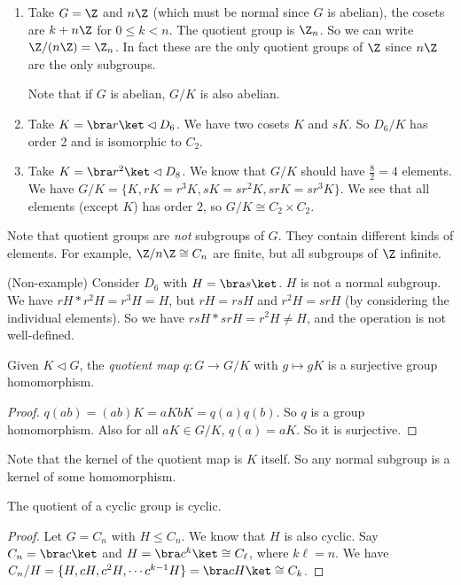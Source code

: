 \documentclass[a4paper]{article}
\begin{document}
\begin{eg}\leavevmode
  \begin{enumerate}
    \item Take $G = \Z$ and $n\Z$ (which must be normal since $G$ is abelian), the cosets are $k + n\Z$ for $0 \leq k < n$. The quotient group is $\Z_n$. So we can write $\Z/(n\Z) = \Z_n$. In fact these are the only quotient groups of $\Z$ since $n\Z$ are the only subgroups.

      Note that if $G$ is abelian, $G/K$ is also abelian.
    \item Take $K = \bra r\ket \lhd D_6$. We have two cosets $K$ and $sK$. So $D_6/K$ has order 2 and is isomorphic to $C_2$.
    \item Take $K = \bra r^2\ket \lhd D_8$. We know that $G/K$ should have $\frac{8}{2} = 4$ elements. We have $G/K = \{ K, rK = r^3 K, sK = sr^2K, srK = sr^3K\}$. We see that all elements (except $K$) has order $2$, so $G/K\cong C_2\times C_2$.
  \end{enumerate}
\end{eg}
Note that quotient groups are \emph{not} subgroups of $G$. They contain different kinds of elements. For example, $\Z/n\Z \cong C_n$ are finite, but all subgroups of $\Z$ infinite.


\begin{eg}
  (Non-example) Consider $D_6$ with $H = \bra s\ket$. $H$ is not a normal subgroup. We have $rH * r^2 H = r^3 H = H$, but $rH = rsH$ and $r^2H = srH$ (by considering the individual elements). So we have $rsH * srH = r^2 H\not= H$, and the operation is not well-defined.
\end{eg}

\begin{lemma}
  Given $K\lhd G$, the \emph{quotient map} $q: G\rightarrow G/K$ with $g\mapsto gK$ is a surjective group homomorphism.
\end{lemma}

\begin{proof}
  $q(ab) = (ab)K = aKbK = q(a)q(b)$. So $q$ is a group homomorphism. Also for all $aK \in G/K$, $q(a) = aK$. So it is surjective.
\end{proof}
Note that the kernel of the quotient map is $K$ itself. So any normal subgroup is a kernel of some homomorphism.

\begin{prop}
  The quotient of a cyclic group is cyclic.
\end{prop}

\begin{proof}
  Let $G = C_n$ with $H\leq C_n$. We know that $H$ is also cyclic. Say $C_n = \bra c\ket$ and $H = \bra c^k \ket \cong C_\ell$, where $k\ell = n$. We have $C_n/H = \{H, cH, c^2H, \cdots c^{k - 1}H\}=\bra cH\ket \cong C_k$.
\end{proof}
\end{document}
